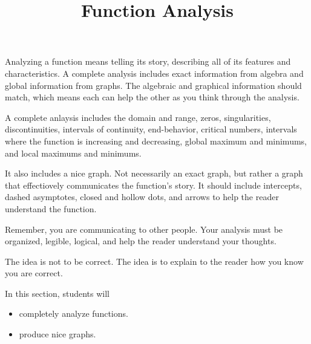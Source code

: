 \documentclass{ximera}
\title{Function Analysis}
\begin{document}
\begin{abstract}
\end{abstract}
\maketitle




Analyzing a function means telling its story, describing all of its features and characteristics.  A complete analysis includes exact information from algebra and global information from graphs.  The algebraic and graphical information should match, which means each can help the other as you think through the analysis.

A complete anlaysis includes the domain and range, zeros, singularities, discontinuities, intervals of continuity, end-behavior, critical numbers, intervals where the function is increasing and decreasing, global maximum and minimums, and local maximums and minimums.

It also includes a nice graph.  Not necessarily an exact graph, but rather a graph that effectiovely communicates the function's story. It should include intercepts, dashed asymptotes, closed and hollow dots, and arrows to help the reader understand the function.  

Remember, you are communicating to other people. Your analysis must be organized, legible, logical, and help the reader understand your thoughts.

The idea is not to be correct.  The idea is to explain to the reader how you know you are correct.























\begin{sectionOutcomes}
In this section, students will 

\begin{itemize}
\item completely analyze functions.
\item produce nice graphs.
\end{itemize}
\end{sectionOutcomes}
\end{document}
